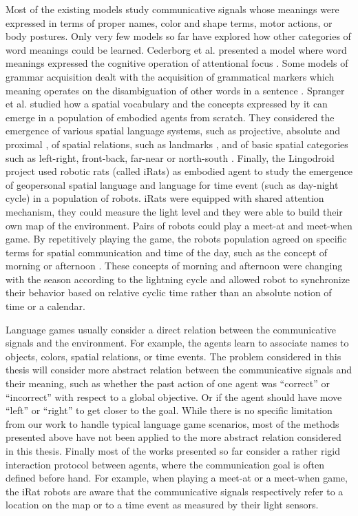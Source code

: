 Most of the existing models study communicative signals whose meanings were expressed in terms of proper names, color and shape terms, motor actions, or body postures. Only very few models so far have explored how other categories of word meanings could be learned. Cederborg et al. presented a model where word meanings expressed the cognitive operation of attentional focus \cite{cederborg2011imitating}. Some models of grammar acquisition dealt with the acquisition of grammatical markers which meaning operates on the disambiguation of other words in a sentence \cite{steels2012fluid}. Spranger et al. studied how a spatial vocabulary and the concepts expressed by it can emerge in a population of embodied agents from scratch. They considered the emergence of various spatial language systems, such as projective, absolute and proximal \cite{spranger2012emergent,spranger2013grounded}, of spatial relations, such as landmarks \cite{spranger2013evolutionary}, and of basic spatial categories such as left-right, front-back, far-near or north-south \cite{spranger2012co}. Finally, the Lingodroid project \cite{schulz2010robots} used robotic rats (called iRats) as embodied agent to study the emergence of geopersonal spatial language and language for time event (such as day-night cycle) in a population of robots. iRats were equipped with shared attention mechanism, they could measure the light level and they were able to build their own map of the environment. Pairs of robots could play a meet-at and meet-when game. By repetitively playing the game, the robots population agreed on specific terms for spatial communication and time of the day, such as the concept of morning or afternoon \cite{schulz2011lingodroids,heath2012long}. These concepts of morning and afternoon were changing with the season according to the lightning cycle and allowed robot to synchronize their behavior based on relative cyclic time rather than an absolute notion of time or a calendar.

Language games usually consider a direct relation between the communicative signals and the environment. For example, the agents learn to associate names to objects, colors, spatial relations, or time events. The problem considered in this thesis will consider more abstract relation between the communicative signals and their meaning, such as whether the past action of one agent was ``correct'' or ``incorrect'' with respect to a global objective. Or if the agent should have move ``left'' or ``right'' to get closer to the goal. While there is no specific limitation from our work to handle typical language game scenarios, most of the methods presented above have not been applied to the more abstract relation considered in this thesis. Finally most of the works presented so far consider a rather rigid interaction protocol between agents, where the communication goal is often defined before hand. For example, when playing a meet-at or a meet-when game, the iRat robots are aware that the communicative signals respectively refer to a location on the map or to a time event as measured by their light sensors.

